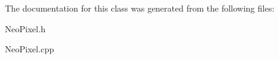 The documentation for this class was generated from the following files\+:\begin{DoxyCompactItemize}
\item 
Neo\+Pixel.\+h\item 
Neo\+Pixel.\+cpp\end{DoxyCompactItemize}
